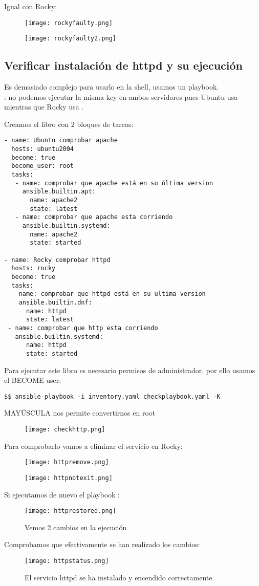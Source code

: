 Igual con Rocky:
\begin{figure}[H]
	\centering
	\texttt{[image: rockyfaulty.png]} 
\end{figure}
\begin{figure}[H]
	\centering
	\texttt{[image: rockyfaulty2.png]} 
\end{figure}
\subsection{Verificar instalación de httpd y su ejecución}
Es demasiado complejo para usarlo en la shell, usamos un playbook. \\
: no podemos ejecutar la misma key en ambos servidores pues Ubuntu usa  mientras que Rocky usa .

Creamos el libro con 2 bloques de tareas: 
\begin{verbatim}
- name: Ubuntu comprobar apache
  hosts: ubuntu2004
  become: true
  become_user: root
  tasks:
   - name: comprobar que apache está en su última version
     ansible.builtin.apt:
       name: apache2
       state: latest
   - name: comprobar que apache esta corriendo
     ansible.builtin.systemd:
       name: apache2
       state: started

- name: Rocky comprobar httpd
  hosts: rocky
  become: true
  tasks:
  - name: comprobar que httpd está en su ultima version
    ansible.builtin.dnf:
      name: httpd
      state: latest
 - name: comprobar que http esta corriendo
   ansible.builtin.systemd: 
      name: httpd
      state: started
\end{verbatim}

Para ejecutar este libro es necesario permisos de administrador, por ello usamos el BECOME user:
\begin{verbatim}
$$ ansible-playbook -i inventory.yaml checkplaybook.yaml -K
\end{verbatim}
 MAYÚSCULA nos permite convertirnos en root
\begin{figure}[H]
	\centering
	\texttt{[image: checkhttp.png]} 
\end{figure}
Para comprobarlo vamos a eliminar el servicio  en Rocky:
\begin{figure}[H]
	\centering
	\texttt{[image: httpremove.png]} 
\end{figure}
\begin{figure}[H]
	\centering
	\texttt{[image: httpnotexit.png]} 
\end{figure}
Si ejecutamos de nuevo el playbook :
\begin{figure}[H]
	\centering
	\texttt{[image: httprestored.png]} 
	\caption{Vemos 2 cambios en la ejecución}
\end{figure}
Comprobamos que efectivamente se han realizado los cambios:
\begin{figure}[H]
	\centering
	\texttt{[image: httpstatus.png]} 
	\caption{El servicio httpd se ha instalado y encendido correctamente}
\end{figure}

